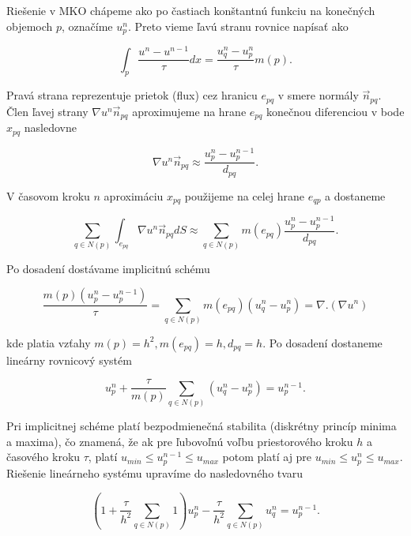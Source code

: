 \documentclass[a4paper,11pt,twoside]{article}%
\begin{document}
Riešenie v MKO chápeme ako po častiach konštantnú funkciu na konečných objemoch $p$, označíme $u_p^n$. Preto vieme ľavú stranu rovnice napísať ako 

\begin{equation} 
\int_p\frac{u^n - u^{n-1}}{\tau} dx = \frac{u^n_q - u^n_p}{\tau} m(p).
\end{equation}

Pravá strana reprezentuje prietok (flux) cez hranicu $e_{pq}$ v smere normály $\vec{n}_{pq}$. Člen ľavej strany $\nabla u^n \vec{n}_{pq}$ aproximujeme na hrane $e_{pq}$ konečnou diferenciou v bode $x_{pq}$ nasledovne

\begin{equation}
\nabla u^n \vec{n}_{pq} \approx \frac{u^n_p - u^{n-1}_p}{d_{pq}}.
\end{equation}

V časovom kroku $n$ aproximáciu $x_{pq}$ použijeme na celej hrane $e_{qp}$ a dostaneme

\begin{equation}
\sum_{q\in N(p)} \int_{e_{pq}} \nabla u^n \vec{n}_{pq} dS \approx \sum_{q\in N(p)} m(e_{pq})\frac{u^n_p - u^{n-1}_p}{d_{pq}}.
\end{equation}

Po dosadení dostávame implicitnú schému  

\begin{equation}
\frac{m(p)(u_p^n -u_p^{n - 1})}{\tau} = \sum_{q \in N(p)} m(e_{pq})(u_q^n - u_p^n) = \nabla . (\nabla u^n)
\end{equation}

kde platia vzťahy $m(p) = h^2, m(e_{pq}) = h, d_{pq} = h$. Po dosadení dostaneme lineárny rovnicový systém

\begin{equation}
u_p^n + \frac{\tau}{m(p)}\sum_{q \in N(p)} (u_q^n - u_p^n) = u_p^{n - 1}.
\end{equation}

Pri implicitnej schéme platí bezpodmienečná stabilita (diskrétny princíp minima a maxima), čo znamená, že ak pre ľubovoľnú voľbu priestorového kroku $h$ a časového kroku $\tau$, platí $u_{min} \leq u_p^{n - 1} \leq u_{max}$ potom platí aj pre $u_{min} \leq u_p^{n} \leq u_{max}$. Riešenie lineárneho systému upravíme do nasledovného tvaru

\begin{equation} \label{eq:eihe}
(1 + \frac{\tau}{h^2} \sum_{q \in N(p)}1)u_p^n - \frac{\tau}{h^2} \sum_{q \in N(p)}u_q^n = u_p^{n - 1}.
\end{equation}
\end{document}
